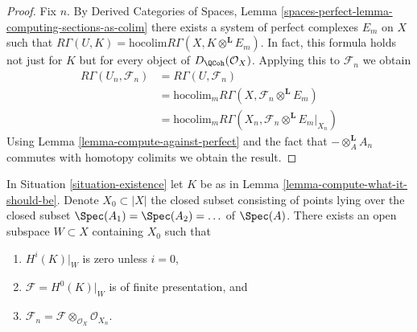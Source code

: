 \begin{proof}
Fix $n$. By Derived Categories of Spaces, Lemma
\ref{spaces-perfect-lemma-computing-sections-as-colim}
there exists a system of perfect complexes $E_m$
on $X$ such that
$R\Gamma(U, K) = \text{hocolim} R\Gamma(X, K \otimes^\mathbf{L} E_m)$.
In fact, this formula holds not just for $K$ but for every object of
$D_\QCoh(\mathcal{O}_X)$.
Applying this to $\mathcal{F}_n$
we obtain
\begin{align*}
R\Gamma(U_n, \mathcal{F}_n)
& =
R\Gamma(U, \mathcal{F}_n) \\
& =
\text{hocolim}_m R\Gamma(X, \mathcal{F}_n \otimes^\mathbf{L} E_m) \\
& =
\text{hocolim}_m R\Gamma(X_n, \mathcal{F}_n \otimes^\mathbf{L} E_m|_{X_n})
\end{align*}
Using Lemma \ref{lemma-compute-against-perfect}
and the fact that $- \otimes_A^\mathbf{L} A_n$
commutes with homotopy colimits we obtain the result.
\end{proof}

\begin{lemma}
\label{lemma-finitely-presented}
In Situation \ref{situation-existence} let $K$ be as in
Lemma \ref{lemma-compute-what-it-should-be}.
Denote $X_0 \subset |X|$ the closed subset
consisting of points lying over the closed subset
$\Spec(A_1) = \Spec(A_2) = \ldots$ of $\Spec(A)$.
There exists an open subspace $W \subset X$ containing $X_0$
such that
\begin{enumerate}
\item $H^i(K)|_W$ is zero unless $i = 0$,
\item $\mathcal{F} = H^0(K)|_W$ is of finite presentation, and
\item $\mathcal{F}_n = \mathcal{F} \otimes_{\mathcal{O}_X} \mathcal{O}_{X_n}$.
\end{enumerate}
\end{lemma}

